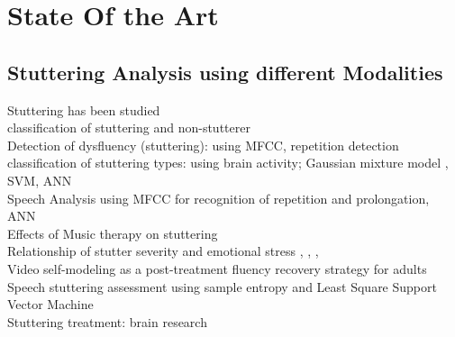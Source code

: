 \chapter{State Of the Art}
\label{cha:stateofart}





\section{Stuttering Analysis using different Modalities}

Stuttering has been studied \\

classification of stuttering and non-stutterer \cite{saltuklaroglu2017eeg}\\

Detection of dysfluency (stuttering): using MFCC\cite{jhawar2016speech}, repetition detection\cite{Ramteke2016}\\

classification of stuttering types: using brain activity\cite{Jiang2012}; Gaussian mixture model \cite{Mahesha2016}, SVM\cite{Mahesha2015}, ANN \cite{Pravin2017}\\


Speech Analysis using MFCC for recognition of repetition and prolongation\cite{Chee2009}, ANN \cite{Savin2016}\\


Effects of Music therapy on stuttering \cite{Baumann2017}\\

Relationship of stutter severity and emotional stress \cite{Choi2016}, \cite{Smith2017}, \cite{Vanryckeghem2001}, \cite{Alm2015}\\


Video self-modeling as a post-treatment fluency recovery strategy for adults\cite{Harasym2015}\\

Speech stuttering assessment using sample entropy and Least Square Support Vector Machine\cite{Hariharan2012}\\
 
Stuttering treatment: brain research \cite{Ingham2017}\\






